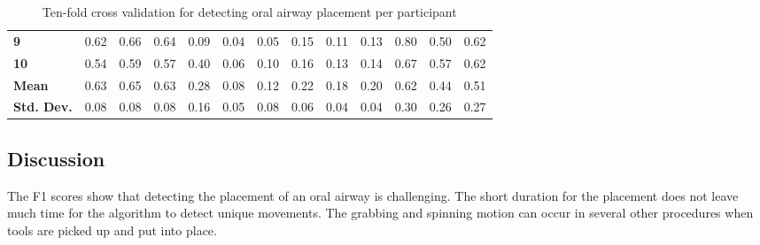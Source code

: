 \begin{table}[]
\begin{tabular}{lllllllllllll}
		\textbf{9}   & 0.62 & 0.66 & 0.64 & 0.09 & 0.04 & 0.05 & 0.15 & 0.11 & 0.13 & 0.80 & 0.50 & 0.62 \\
		\textbf{10} & 0.54 & 0.59 & 0.57 & 0.40 & 0.06 & 0.10 & 0.16 & 0.13 & 0.14 & 0.67 & 0.57 & 0.62 \\
		\hline
		\textbf{Mean} & 0.63 & 0.65 & 0.63 & 0.28 & 0.08 & 0.12 & 0.22 & 0.18 & 0.20 & 0.62 & 0.44 & 0.51 \\
		\textbf{Std. Dev.} & 0.08 & 0.08 & 0.08 & 0.16 & 0.05 & 0.08 & 0.06 & 0.04 & 0.04 & 0.30 & 0.26 & 0.27 \\
	\end{tabular}
	\caption{Ten-fold cross validation for detecting oral airway placement per participant}
	\label{tab:o:ml}
\end{table}
\subsection{Discussion}
\label{sec:Results:Oral-Airway:Discussion}
The F1 scores show that detecting the placement of an oral airway is challenging. The short duration for the placement does not leave much time for the algorithm to detect unique movements. The grabbing and spinning motion can occur in several other procedures when tools are picked up and put into place.
